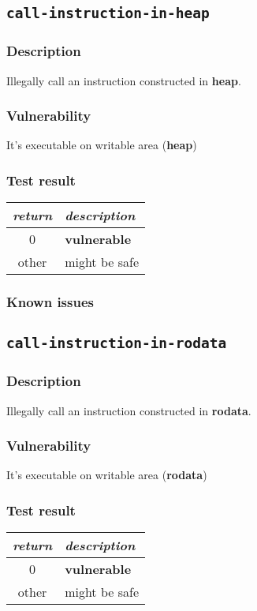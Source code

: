 \documentclass[a4paper]{book}
\begin{document}
\newpage

\subsection{\texttt{call-instruction-in-heap}}\label{test-call-instruction-in-heap}
\subsubsection{Description}
Illegally call an instruction constructed in \textbf{heap}.
\subsubsection{Vulnerability}
It’s executable on writable area (\textbf{heap})
\subsubsection{Test result}
\begin{tabular}{cl}
  \toprule
  \emph{return}  & \emph{description} \\
  \midrule
  0              & \textbf{vulnerable} \\
  other          & might be safe \\
  \bottomrule
\end{tabular}
  
\subsubsection{Known issues}

\newpage

\subsection{\texttt{call-instruction-in-rodata}}\label{test-call-instruction-in-rodata}
\subsubsection{Description}
Illegally call an instruction constructed in \textbf{rodata}.
\subsubsection{Vulnerability}
It’s executable on writable area (\textbf{rodata})
\subsubsection{Test result}
\begin{tabular}{cl}
  \toprule
  \emph{return}  & \emph{description} \\
  \midrule
  0              & \textbf{vulnerable} \\
  other          & might be safe \\
  \bottomrule
\end{tabular}
\end{document}

